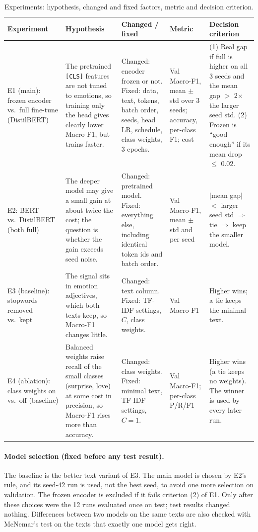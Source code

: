 \documentclass[11pt,a4paper]{article}
\begin{document}
\begin{table}[H]
\centering
\caption{Experiments: hypothesis, changed and fixed factors, metric and decision criterion.}
\label{tab:design}
\footnotesize
\begin{tabularx}{\textwidth}{@{}p{2.1cm}LLp{2.2cm}L@{}}
\toprule
\textbf{Experiment} & \textbf{Hypothesis} & \textbf{Changed / fixed} & \textbf{Metric} & \textbf{Decision criterion}\\
\midrule
E1 (main): frozen encoder vs.\ full fine-tune (DistilBERT) &
The pretrained \texttt{[CLS]} features are not tuned to emotions, so training only the head gives clearly lower Macro-F1, but trains faster. &
Changed: encoder frozen or not. Fixed: data, text, tokens, batch order, seeds, head LR, schedule, class weights, 3 epochs. &
Val Macro-F1, mean $\pm$ std over 3 seeds; accuracy, per-class F1; cost &
(1) Real gap if full is higher on all 3 seeds and the mean gap $>$ 2$\times$ the larger seed std. (2) Frozen is ``good enough'' if its mean drop $\le$ 0.02.\\
\addlinespace
E2: BERT vs.\ DistilBERT (both full) &
The deeper model may give a small gain at about twice the cost; the question is whether the gain exceeds seed noise. &
Changed: pretrained model. Fixed: everything else, including identical token ids and batch order. &
Val Macro-F1, mean $\pm$ std and per seed &
$|$mean gap$|$ $<$ larger seed std $\Rightarrow$ tie $\Rightarrow$ keep the smaller model.\\
\addlinespace
E3 (baseline): stopwords removed vs.\ kept &
The signal sits in emotion adjectives, which both texts keep, so Macro-F1 changes little. &
Changed: text column. Fixed: TF-IDF settings, $C$, class weights. &
Val Macro-F1 &
Higher wins; a tie keeps the minimal text.\\
\addlinespace
E4 (ablation): class weights on vs.\ off (baseline) &
Balanced weights raise recall of the small classes (surprise, love) at some cost in precision, so Macro-F1 rises more than accuracy. &
Changed: class weights. Fixed: minimal text, TF-IDF settings, $C=1$. &
Val Macro-F1; per-class P/R/F1 &
Higher wins (a tie keeps no weights). The winner is used by every later run.\\
\bottomrule
\end{tabularx}
\end{table}

\paragraph{Model selection (fixed before any test result).} The baseline is the better text variant of E3. The main model is chosen by E2's rule, and its seed-42 run is used, not the best seed, to avoid one more selection on validation. The frozen encoder is excluded if it fails criterion (2) of E1. Only after these choices were the 12 runs evaluated once on test; test results changed nothing. Differences between two models on the same texts are also checked with McNemar's test \cite{mcnemar1947} on the texts that exactly one model gets right.
\end{document}
